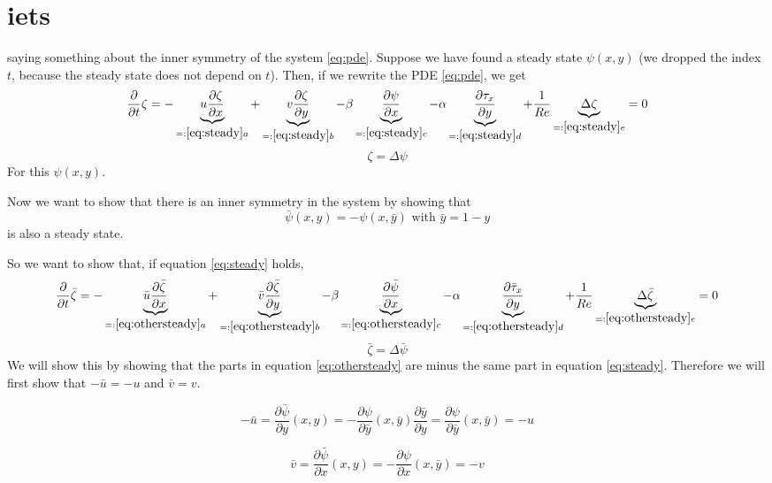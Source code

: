 \section{iets}
saying something about the inner symmetry of the system \ref{eq:pde}.
Suppose we have found a steady state $\psi(x,y)$ (we dropped the index $t$, because the steady state does not depend on $t$). Then, if we rewrite the PDE \ref{eq:pde}, we get
 \begin{equation}
   \frac{\partial}{\partial t}\zeta= - \underbrace{   u \frac{\partial\zeta}{\partial x}}_{=:\ref{eq:steady} a} +\underbrace{  v \frac{\partial\zeta}{\partial y}}_{=:\ref{eq:steady}b} - \beta \underbrace{\frac{\partial \psi}{\partial x} }_{=:\ref{eq:steady}c} - \alpha\underbrace{ \frac{\partial \tau_x}{\partial y}}_{=:\ref{eq:steady} d} +\frac{1}{Re}  \underbrace{\Delta \zeta}_{=:\ref{eq:steady}e}=0\label{eq:steady}
\end{equation}
 $$\zeta=\Delta \psi $$
For this $\psi(x,y)$.

Now we want to show that there is an inner symmetry in the system by showing that
$$\bar{\psi}(x,y)=-\psi(x,\bar{y}) \text{ with }\bar{y}=1-y$$
is also a steady state.

So we want to show that, if equation \ref{eq:steady} holds, 
 \begin{equation} \frac{\partial}{\partial t}\bar{\zeta}=- \underbrace{  \bar u \frac{\partial\bar{\zeta}}{\partial x}}_{=:\ref{eq:othersteady} a} +\underbrace{ \bar v \frac{\partial\bar{\zeta}}{\partial y}}_{=:\ref{eq:othersteady}b} -\beta \underbrace{ \frac{\partial \bar{\psi}}{\partial x} }_{=:\ref{eq:othersteady}c} -\alpha  \underbrace{\frac{\partial \bar \tau_x}{\partial y}}_{=:\ref{eq:othersteady}d} + \frac{1}{Re} \underbrace{\Delta \bar{\zeta}}_{=:\ref{eq:othersteady}e}=0 \label{eq:othersteady}
 \end{equation}
 $$\bar{\zeta}=\Delta \bar{\psi}$$ 
We will show this by showing that the parts in equation \ref{eq:othersteady} are minus the same part in equation \ref{eq:steady}. Therefore we will first show that $-\bar{u}=-u$ and $\bar{v}=v$. 
 
\begin{equation*}
-\bar u=\frac{\partial \bar{\psi}}{\partial y}(x,y)=-\frac{\partial \psi}{\partial \bar y}(x,\bar y)\frac{\partial \bar{y}}{\partial y}=\frac{\partial \psi}{\partial \bar y}(x,\bar y)=-u
\end{equation*}

\begin{equation*}
\bar v=\frac{\partial \bar{\psi}}{\partial x}(x,y)=-\frac{\partial \psi}{\partial x}(x,\bar y)=-v
\end{equation*}

